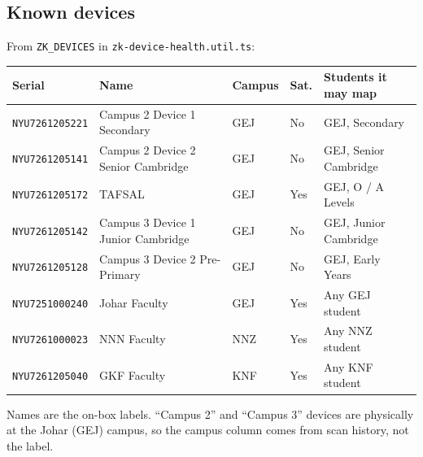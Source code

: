 \documentclass[11pt]{article}
\begin{document}
\subsection{Known devices}
From \texttt{ZK\_DEVICES} in \texttt{zk-device-health.util.ts}:
\begin{center}
\begin{tabularx}{\textwidth}{@{}l P{0.27\textwidth} l l L@{}}
\toprule
\textbf{Serial} & \textbf{Name} & \textbf{Campus} & \textbf{Sat.} & \textbf{Students it may map} \\
\midrule
\texttt{NYU7261205221} & Campus 2 Device 1 Secondary & GEJ & No & GEJ, Secondary \\
\texttt{NYU7261205141} & Campus 2 Device 2 Senior Cambridge & GEJ & No & GEJ, Senior Cambridge \\
\texttt{NYU7261205172} & TAFSAL & GEJ & Yes & GEJ, O / A Levels \\
\texttt{NYU7261205142} & Campus 3 Device 1 Junior Cambridge & GEJ & No & GEJ, Junior Cambridge \\
\texttt{NYU7261205128} & Campus 3 Device 2 Pre-Primary & GEJ & No & GEJ, Early Years \\
\texttt{NYU7251000240} & Johar Faculty & GEJ & Yes & Any GEJ student \\
\texttt{NYU7261000023} & NNN Faculty & NNZ & Yes & Any NNZ student \\
\texttt{NYU7261205040} & GKF Faculty & KNF & Yes & Any KNF student \\
\bottomrule
\end{tabularx}
\end{center}
Names are the on-box labels. ``Campus 2'' and ``Campus 3'' devices are physically at the Johar (GEJ) campus, so the
campus column comes from scan history, not the label.

\end{document}
